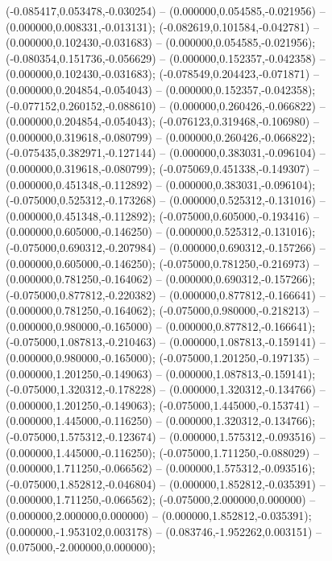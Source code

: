  (-0.085417,0.053478,-0.030254) -- (0.000000,0.054585,-0.021956) -- (0.000000,0.008331,-0.013131);
 (-0.082619,0.101584,-0.042781) -- (0.000000,0.102430,-0.031683) -- (0.000000,0.054585,-0.021956);
 (-0.080354,0.151736,-0.056629) -- (0.000000,0.152357,-0.042358) -- (0.000000,0.102430,-0.031683);
 (-0.078549,0.204423,-0.071871) -- (0.000000,0.204854,-0.054043) -- (0.000000,0.152357,-0.042358);
 (-0.077152,0.260152,-0.088610) -- (0.000000,0.260426,-0.066822) -- (0.000000,0.204854,-0.054043);
 (-0.076123,0.319468,-0.106980) -- (0.000000,0.319618,-0.080799) -- (0.000000,0.260426,-0.066822);
 (-0.075435,0.382971,-0.127144) -- (0.000000,0.383031,-0.096104) -- (0.000000,0.319618,-0.080799);
 (-0.075069,0.451338,-0.149307) -- (0.000000,0.451348,-0.112892) -- (0.000000,0.383031,-0.096104);
 (-0.075000,0.525312,-0.173268) -- (0.000000,0.525312,-0.131016) -- (0.000000,0.451348,-0.112892);
 (-0.075000,0.605000,-0.193416) -- (0.000000,0.605000,-0.146250) -- (0.000000,0.525312,-0.131016);
 (-0.075000,0.690312,-0.207984) -- (0.000000,0.690312,-0.157266) -- (0.000000,0.605000,-0.146250);
 (-0.075000,0.781250,-0.216973) -- (0.000000,0.781250,-0.164062) -- (0.000000,0.690312,-0.157266);
 (-0.075000,0.877812,-0.220382) -- (0.000000,0.877812,-0.166641) -- (0.000000,0.781250,-0.164062);
 (-0.075000,0.980000,-0.218213) -- (0.000000,0.980000,-0.165000) -- (0.000000,0.877812,-0.166641);
 (-0.075000,1.087813,-0.210463) -- (0.000000,1.087813,-0.159141) -- (0.000000,0.980000,-0.165000);
 (-0.075000,1.201250,-0.197135) -- (0.000000,1.201250,-0.149063) -- (0.000000,1.087813,-0.159141);
 (-0.075000,1.320312,-0.178228) -- (0.000000,1.320312,-0.134766) -- (0.000000,1.201250,-0.149063);
 (-0.075000,1.445000,-0.153741) -- (0.000000,1.445000,-0.116250) -- (0.000000,1.320312,-0.134766);
 (-0.075000,1.575312,-0.123674) -- (0.000000,1.575312,-0.093516) -- (0.000000,1.445000,-0.116250);
 (-0.075000,1.711250,-0.088029) -- (0.000000,1.711250,-0.066562) -- (0.000000,1.575312,-0.093516);
 (-0.075000,1.852812,-0.046804) -- (0.000000,1.852812,-0.035391) -- (0.000000,1.711250,-0.066562);
 (-0.075000,2.000000,0.000000) -- (0.000000,2.000000,0.000000) -- (0.000000,1.852812,-0.035391);
 (0.000000,-1.953102,0.003178) -- (0.083746,-1.952262,0.003151) -- (0.075000,-2.000000,0.000000);
